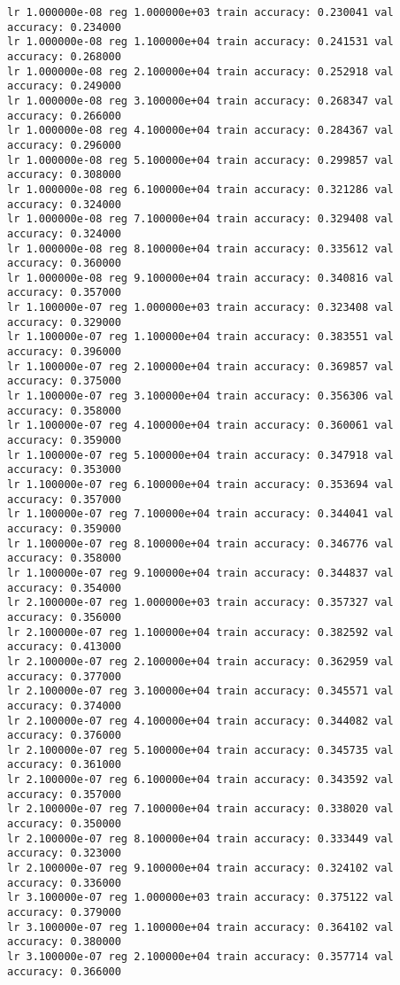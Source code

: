 \documentclass[11pt]{article}
\begin{document}
\begin{Verbatim}[commandchars=\\\{\}]
lr 1.000000e-08 reg 1.000000e+03 train accuracy: 0.230041 val accuracy: 0.234000
lr 1.000000e-08 reg 1.100000e+04 train accuracy: 0.241531 val accuracy: 0.268000
lr 1.000000e-08 reg 2.100000e+04 train accuracy: 0.252918 val accuracy: 0.249000
lr 1.000000e-08 reg 3.100000e+04 train accuracy: 0.268347 val accuracy: 0.266000
lr 1.000000e-08 reg 4.100000e+04 train accuracy: 0.284367 val accuracy: 0.296000
lr 1.000000e-08 reg 5.100000e+04 train accuracy: 0.299857 val accuracy: 0.308000
lr 1.000000e-08 reg 6.100000e+04 train accuracy: 0.321286 val accuracy: 0.324000
lr 1.000000e-08 reg 7.100000e+04 train accuracy: 0.329408 val accuracy: 0.324000
lr 1.000000e-08 reg 8.100000e+04 train accuracy: 0.335612 val accuracy: 0.360000
lr 1.000000e-08 reg 9.100000e+04 train accuracy: 0.340816 val accuracy: 0.357000
lr 1.100000e-07 reg 1.000000e+03 train accuracy: 0.323408 val accuracy: 0.329000
lr 1.100000e-07 reg 1.100000e+04 train accuracy: 0.383551 val accuracy: 0.396000
lr 1.100000e-07 reg 2.100000e+04 train accuracy: 0.369857 val accuracy: 0.375000
lr 1.100000e-07 reg 3.100000e+04 train accuracy: 0.356306 val accuracy: 0.358000
lr 1.100000e-07 reg 4.100000e+04 train accuracy: 0.360061 val accuracy: 0.359000
lr 1.100000e-07 reg 5.100000e+04 train accuracy: 0.347918 val accuracy: 0.353000
lr 1.100000e-07 reg 6.100000e+04 train accuracy: 0.353694 val accuracy: 0.357000
lr 1.100000e-07 reg 7.100000e+04 train accuracy: 0.344041 val accuracy: 0.359000
lr 1.100000e-07 reg 8.100000e+04 train accuracy: 0.346776 val accuracy: 0.358000
lr 1.100000e-07 reg 9.100000e+04 train accuracy: 0.344837 val accuracy: 0.354000
lr 2.100000e-07 reg 1.000000e+03 train accuracy: 0.357327 val accuracy: 0.356000
lr 2.100000e-07 reg 1.100000e+04 train accuracy: 0.382592 val accuracy: 0.413000
lr 2.100000e-07 reg 2.100000e+04 train accuracy: 0.362959 val accuracy: 0.377000
lr 2.100000e-07 reg 3.100000e+04 train accuracy: 0.345571 val accuracy: 0.374000
lr 2.100000e-07 reg 4.100000e+04 train accuracy: 0.344082 val accuracy: 0.376000
lr 2.100000e-07 reg 5.100000e+04 train accuracy: 0.345735 val accuracy: 0.361000
lr 2.100000e-07 reg 6.100000e+04 train accuracy: 0.343592 val accuracy: 0.357000
lr 2.100000e-07 reg 7.100000e+04 train accuracy: 0.338020 val accuracy: 0.350000
lr 2.100000e-07 reg 8.100000e+04 train accuracy: 0.333449 val accuracy: 0.323000
lr 2.100000e-07 reg 9.100000e+04 train accuracy: 0.324102 val accuracy: 0.336000
lr 3.100000e-07 reg 1.000000e+03 train accuracy: 0.375122 val accuracy: 0.379000
lr 3.100000e-07 reg 1.100000e+04 train accuracy: 0.364102 val accuracy: 0.380000
lr 3.100000e-07 reg 2.100000e+04 train accuracy: 0.357714 val accuracy: 0.366000

\end{Verbatim}
\end{document}
